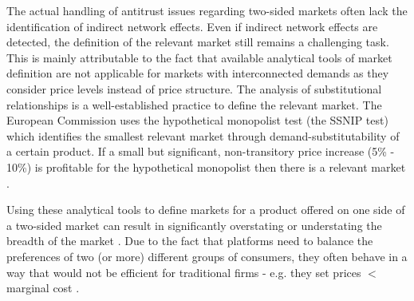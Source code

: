 \documentclass[12pt,a4paper,notitlepage]{article}
\begin{document}
The actual handling of antitrust issues regarding two-sided markets often lack the identification of indirect network effects. Even if indirect network effects are detected, the definition of the relevant market still remains a challenging task. This is mainly attributable to the fact that available analytical tools of market definition are not applicable for markets with interconnected demands as they consider price levels instead of price structure. The analysis of substitutional relationships is a well-established practice to define the relevant market. The European Commission uses the hypothetical monopolist test (the SSNIP test) which identifies the smallest relevant market through demand-substitutability of a certain product. If a small but significant, non-transitory price increase (5\% - 10\%) is profitable for the hypothetical monopolist then there is a relevant market \citep{motta_competition_2004}. 

Using these analytical tools to define markets for a product offered on one side of a two-sided market can result in significantly overstating or understating the breadth of the market \citep{evans_analysis_2008}. Due to the fact that platforms need to balance the preferences of two (or more) different groups of consumers, they often behave in a way that would not be efficient for traditional firms - e.g. they set prices $<$ marginal cost \citep{chandra_mergers_2009}.

\end{document}
